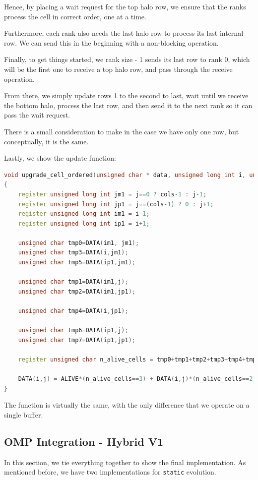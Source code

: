 \documentclass{report}
\begin{document}
Hence, by placing a wait request for the top halo row, we ensure that the ranks 
process the cell in correct order, one at a time.

Furthermore, each rank also needs the last halo row to process its last internal
row. We can send this in the beginning with a non-blocking operation.

Finally, to get things started, we rank size - 1 sends its last row to rank 0, which 
will be the first one to receive a top halo row, and pass through the receive operation.

From there, we simply update rows 1 to the second to last, wait until we receive 
the bottom halo, process the last row, and then send it to the next rank so it 
can pass the wait request.

There is a small consideration to make in the case we have only one row, but 
conceptually, it is the same.

Lastly, we show the update function:

\begin{lstlisting}[language=C++]
void upgrade_cell_ordered(unsigned char * data, unsigned long int i, unsigned long int j)
{
    register unsigned long int jm1 = j==0 ? cols-1 : j-1;
    register unsigned long int jp1 = j==(cols-1) ? 0 : j+1;
    register unsigned long int im1 = i-1;
    register unsigned long int ip1 = i+1;

    unsigned char tmp0=DATA(im1, jm1);
    unsigned char tmp3=DATA(i,jm1);
    unsigned char tmp5=DATA(ip1,jm1);

    unsigned char tmp1=DATA(im1,j);
    unsigned char tmp2=DATA(im1,jp1);

    unsigned char tmp4=DATA(i,jp1);

    unsigned char tmp6=DATA(ip1,j);
    unsigned char tmp7=DATA(ip1,jp1);

    register unsigned char n_alive_cells = tmp0+tmp1+tmp2+tmp3+tmp4+tmp5+tmp6+tmp7;

    DATA(i,j) = ALIVE*(n_alive_cells==3) + DATA(i,j)*(n_alive_cells==2);
}
\end{lstlisting}
The function is virtually the same, with the only difference that we operate on 
a single buffer.

\subsection{OMP Integration - Hybrid V1}

In this section, we tie everything together to show the final implementation. 
As mentioned before, we have two implementations for \texttt{static} evolution.
\end{document}
